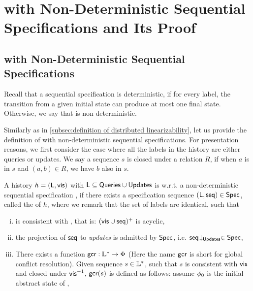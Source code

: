 \forget
{
\section{\crdtlin{} with Non-Deterministic Sequential Specifications and Its Proof}
\label{sec:appendix RA-linearizability with non-deterministic sequential specifications and its proof}



\subsection{\crdtlin{} with Non-Deterministic Sequential Specifications}
\label{subsec:appendix RA-linearizability with non-deterministic sequential specifications}

Recall that a sequential specification \Spec{} is deterministic, if for every label, the transition from a given initial state can produce at most one final state. Otherwise, we say that \Spec{} is non-deterministic.

Similarly as in \sectionautorefname \ref{subsec:definition of distributed linearizability}, let us provide the definition of \crdtlin{} with non-deterministic sequential specifications. For presentation reasons, we first consider the case where all the labels in the history are either queries or updates. We say a sequence $s$ is closed under a relation $R$, if when $a$ is in $s$ and $(a,b) \in R$, we have $b$ also in $s$.

\begin{definition}
\label{definition:ralinearizability1 with non-deterministic specifications}
A history $h = (\mathsf{L},\mathsf{vis})$ with $\mathsf{L}\subseteq \mathsf{Queries}\cup\mathsf{Updates}$ is \crdtlinearizable{} w.r.t. a non-deterministic sequential specification \Spec{}, if there exists a specification sequence $(\mathsf{L}, \mathsf{seq}) \in \mathsf{Spec}{}$, called the \emph{\crdtlinearization{}} of $h$, where we remark that the set of labels are identical, such that
\begin{enumerate}[(i)]
\item \aseqord{} is consistent with  \avisord{}, that is: $(\mathsf{vis} \cup \mathsf{seq})^{+}$ is acyclic,

\item the projection of $\mathsf{seq}$ to \emph{updates} is admitted by $\mathsf{Spec}$, i.e. $\mathsf{seq}\!\downarrow_{\mathsf{Updates}} \in \mathsf{Spec}$,

\item There exists a function $\mathsf{gcr}: \mathbb{L}^* \rightarrow \Phi$ (Here the name $\mathsf{gcr}$ is short for global conflict resolution). Given sequence $s \in \mathbb{L}^*$, such that $s$ is consistent with $\mathsf{vis}$ and closed under $\mathsf{vis}^{-1}$, $\mathsf{gcr}(s)$ is defined as follows: assume $\phi_0$ is the initial abstract state of \Spec{},


\end{enumerate}
\end{definition}}
